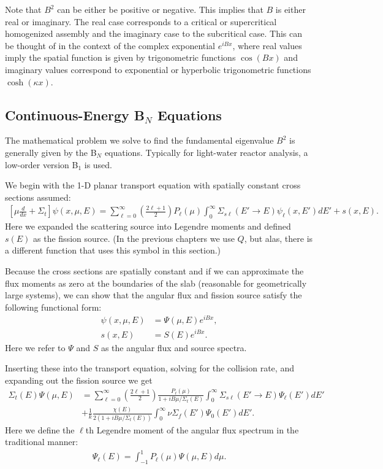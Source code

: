 Note that $B^2$ can be either be positive or negative. This implies that $B$ is either real or imaginary. The real case corresponds to a critical or supercritical homogenized assembly and the imaginary case to the subcritical case. This can be thought of in the context of the complex exponential $e^{iBx}$, where real values imply the spatial function is given by trigonometric functions $\cos(Bx)$ and imaginary values correspond to exponential or hyperbolic trigonometric functions $\cosh(\kappa x)$.




\subsection{Continuous-Energy B$_N$ Equations}

The mathematical problem we solve to find the fundamental eigenvalue $B^2$ is generally given by the B$_N$ equations. Typically for light-water reactor analysis, a low-order version B$_1$ is used.

We begin with the 1-D planar transport equation with spatially constant cross sections assumed:
\begin{align}
  \left[ \mu \frac{d}{dx} + \Sigma_t \right] \psi(x,\mu,E) = \sum_{\ell=0}^\infty \left( \frac{2\ell + 1}{2} \right) P_\ell(\mu) \int_0^\infty \Sigma_{s\ell}(E' \rightarrow E) \psi_\ell(x,E') dE' + s(x,E) .
\end{align}
Here we expanded the scattering source into Legendre moments and defined $s(E)$ as the fission source. (In the previous chapters we use $Q$, but alas, there is a different function that uses this symbol in this section.)

Because the cross sections are spatially constant and if we can approximate the flux moments as zero at the boundaries of the slab (reasonable for geometrically large systems), we can show that the angular flux and fission source satisfy the following functional form:
\begin{subequations}
\begin{align}
  \psi(x,\mu,E) &= \Psi(\mu,E) e^{i B x}, \\
  s(x,E) &= S(E) e^{i B x}.
\end{align}
\end{subequations}
Here we refer to $\Psi$ and $S$ as the angular flux and source spectra. 

Inserting these into the transport equation, solving for the collision rate, and expanding out the fission source we get
\begin{align}
  \Sigma_t(E) \Psi(\mu,E) 
  &= \sum_{\ell=0}^\infty \left( \frac{2\ell + 1}{2} \right) \frac{ P_\ell(\mu) }{ 1 + i B \mu / \Sigma_t(E) } \int_0^\infty \Sigma_{s\ell}(E' \rightarrow E) \Psi_\ell(E') dE' \nonumber \\
  &+ \frac{1}{k} \frac{  \chi(E) }{ 2 ( 1 + i B \mu / \Sigma_t(E) ) } \int_0^\infty \nu\Sigma_f(E') \Psi_0(E') dE' .
\end{align}
Here we define the $\ell$th Legendre moment of the angular flux spectrum in the traditional manner:
\begin{align}
  \Psi_\ell(E) = \int_{-1}^1 P_\ell(\mu) \Psi(\mu,E) d\mu .
\end{align}

